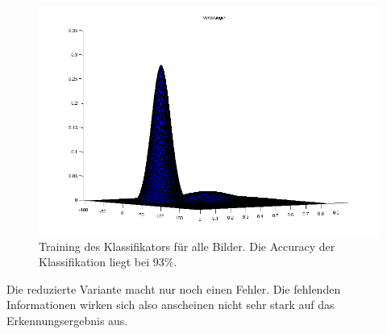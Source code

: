 \documentclass[a4paper,10pt]{article}
\begin{document}
\begin{figure}[htbp]
  \centering
    \includegraphics[width=1\linewidth]{plot7.png}
  \caption{Training des Klassifikators für alle Bilder. Die Accuracy der Klassifikation liegt bei 93\%.}
\end{figure}

Die reduzierte Variante macht nur noch einen Fehler. Die fehlenden Informationen wirken sich also anscheinen nicht sehr stark auf das Erkennungsergebnis aus.
\end{document}
